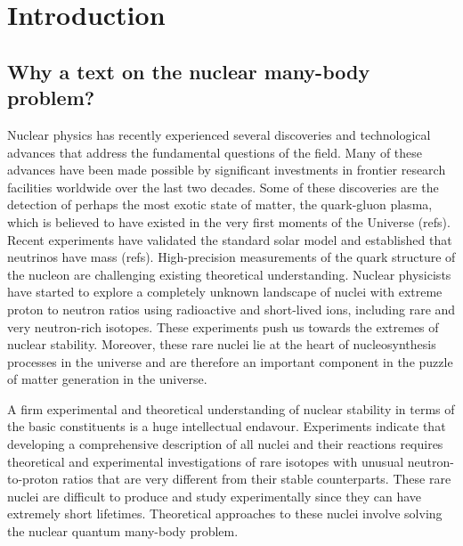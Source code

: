 \chapter{Introduction}\label{chap:introduction}


\section{Why a text on the nuclear many-body problem?}\label{sec:introduction_why}


Nuclear physics has recently experienced several discoveries and
technological advances that address the fundamental questions of the
field.  Many of these advances have been made possible by significant
investments in frontier research facilities worldwide over the last
two decades. Some of these discoveries are the detection of perhaps
the most exotic state of matter, the quark-gluon plasma, which is
believed to have existed in the very first moments of the Universe
(refs).  Recent experiments have validated the standard solar model
and established that neutrinos have mass (refs). High-precision
measurements of the quark structure of the nucleon are challenging
existing theoretical understanding.  Nuclear physicists have started
to explore a completely unknown landscape of nuclei with extreme
proton to neutron ratios using radioactive and short-lived ions,
including rare and very neutron-rich isotopes.  These experiments push
us towards the extremes of nuclear stability.  Moreover, these rare
nuclei lie at the heart of nucleosynthesis processes in the universe
and are therefore an important component in the puzzle of matter
generation in the universe.

A firm experimental and theoretical understanding of nuclear stability
in terms of the basic constituents is a huge intellectual endavour.
Experiments indicate that developing a comprehensive description of
all nuclei and their reactions requires theoretical and experimental
investigations of rare isotopes with unusual neutron-to-proton ratios
that are very different from their stable counterparts.  These rare
nuclei are difficult to produce and study experimentally since they
can have extremely short lifetimes. Theoretical approaches to these
nuclei involve solving the nuclear quantum many-body problem.


